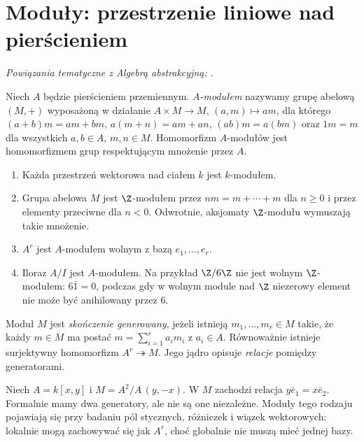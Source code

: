 \section{Moduły: przestrzenie liniowe nad pierścieniem}
\label{sec:moduly}

\noindent\emph{Powiązania tematyczne z Algebrą abstrakcyjną:} .


\begin{definicja}[Moduł]
Niech $A$ będzie pierścieniem przemiennym. \emph{$A$-modułem}
nazywamy grupę abelową $(M,+)$ wyposażoną w działanie
$A\times M\to M$, $(a,m)\mapsto am$, dla którego
$(a+b)m=am+bm$, $a(m+n)=am+an$,
$(ab)m=a(bm)$ oraz $1m=m$ dla wszystkich
$a,b\in A$, $m,n\in M$. Homomorfizm $A$-modułów
jest homomorfizmem grup respektującym mnożenie przez $A$.
\end{definicja}

\begin{przyklad}
\begin{enumerate}[label=\alph*)]
\item Każda przestrzeń wektorowa nad ciałem $k$ jest $k$-modułem.
\item Grupa abelowa $M$ jest $\Z$-modułem przez
$nm=m+\cdots+m$ dla $n\ge0$ i przez elementy przeciwne
dla $n<0$. Odwrotnie, aksjomaty $\Z$-modułu wymuszają
takie mnożenie.
\item $A^r$ jest $A$-modułem wolnym z bazą $e_1,\ldots,e_r$.
\item Iloraz $A/I$ jest $A$-modułem. Na przykład
$\Z/6\Z$ nie jest wolnym $\Z$-modułem: $6\bar1=0$,
podczas gdy w wolnym module nad $\Z$ niezerowy element
nie może być anihilowany przez $6$.
\end{enumerate}
\end{przyklad}

\begin{definicja}
Moduł $M$ jest \emph{skończenie generowany}, jeżeli istnieją
$m_1,\ldots,m_r\in M$ takie, że każdy $m\in M$ ma postać
$m=\sum_{i=1}^r a_i m_i$ z $a_i\in A$.
Równoważnie istnieje surjektywny homomorfizm
$A^r\twoheadrightarrow M$. Jego jądro opisuje
\emph{relacje} pomiędzy generatorami.
\end{definicja}

\begin{przyklad}
Niech $A=k[x,y]$ i $M=A^2/A\,(y,-x)$.
W $M$ zachodzi relacja $y\bar e_1=x\bar e_2$.
Formalnie mamy dwa generatory, ale nie są one niezależne.
Moduły tego rodzaju pojawiają się przy badaniu pól
stycznych, różniczek i wiązek wektorowych: lokalnie
mogą zachowywać się jak $A^r$, choć globalnie
nie muszą mieć jednej bazy.
\end{przyklad}

